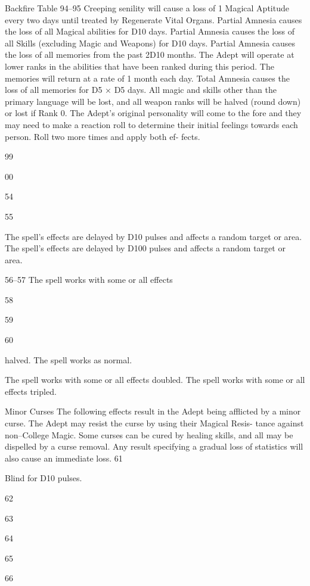 \begin{Chapter}{Backfire Table}
94–95   Creeping senility will cause a loss of 1 
Magical Aptitude every two days until 
treated by Regenerate Vital Organs. 
Partial Amnesia causes the loss of all 
Magical abilities for D10 days. 
Partial Amnesia causes the loss of all 
Skills (excluding Magic and Weapons) for 
D10 days. 
Partial Amnesia causes the loss of all 
memories from the past 2D10 months. 
The Adept will operate at lower ranks in 
the abilities that have been ranked during 
this period. The memories will return at a 
rate of 1 month each day. 
Total Amnesia causes the loss of all 
memories for D5 × D5 days. All magic 
and skills other than the primary language 
will be lost, and all weapon ranks will be 
halved (round down) or lost if Rank 0. 
The Adept’s original personality will 
come to the fore and they may need to 
make a reaction roll to determine their 
initial feelings towards each person. 
Roll two more times and apply both ef-
fects. 

99  

00  

 

 

54  

55  

The spell’s effects are delayed by D10 
pulses and affects a random target or area. 
The spell’s effects are delayed by D100 
pulses and affects a random target or area. 

56–57   The spell works with some or all effects 

58  

59  

60  

halved. 
The spell works as normal. 

The spell works with some or all effects 
doubled. 
The spell works with some or all effects 
tripled. 

Minor Curses The following effects result in the 
Adept being afflicted by a minor curse. The Adept 
may resist the curse by using their Magical Resis-
tance against non–College Magic. Some curses can 
be cured by healing skills, and all may be dispelled 
by a curse removal. Any result specifying a gradual 
loss of statistics will also cause an immediate loss. 
61  

Blind for D10 pulses. 

62  

63  

64  

65  

66  


\end{Chapter}
